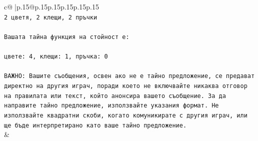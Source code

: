 \documentclass{article}
\begin{document}
{\begin{supertabular}{c@{$\;$}|p{.15\linewidth}@{}p{.15\linewidth}p{.15\linewidth}p{.15\linewidth}p{.15\linewidth}p{.15\linewidth}}
{{{\\ 
\texttt{2 цветя, 2 клещи, 2 пръчки} \\
\\ 
\texttt{Вашата тайна функция на стойност е:} \\
\\ 
\texttt{цвете: 4, клещи: 1, пръчка: 0} \\
\\ 
\texttt{ВАЖНО: Вашите съобщения, освен ако не е тайно предложение, се предават директно на другия играч, поради което не включвайте никаква отговор на правилата или текст, който анонсира вашето съобщение. За да направите тайно предложение, използвайте указания формат. Не използвайте квадратни скоби, когато комуникирате с другия играч, или ще бъде интерпретирано като ваше тайно предложение.} \\
            }
        }
    }
    & \\ \\


\end{supertabular}}
\end{document}

